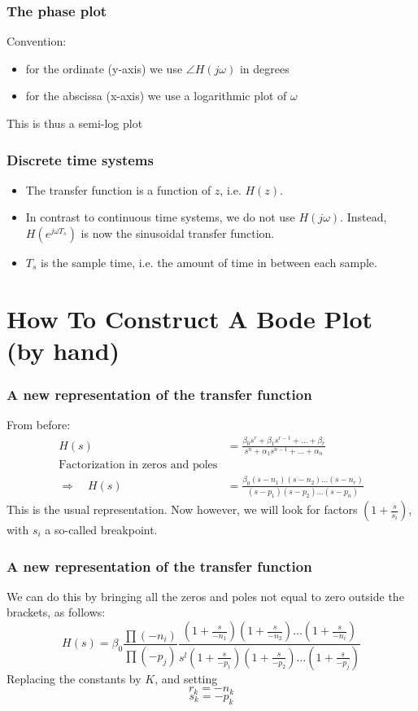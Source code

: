 \begin{frame}
\frametitle{The phase plot}
Convention:
\begin{itemize}
\item for the ordinate (y-axis) we use $\angle H(j\omega)$ in degrees
\item for the abscissa (x-axis) we use a logarithmic plot of $\omega$

\end{itemize}
This is thus a semi-log plot


\end{frame}



\begin{frame}
\frametitle{Discrete time systems}

\begin{itemize}
\item The transfer function is a function of $z$, i.e. $H(z)$.
\item In contrast to continuous time systems, we do not use $H(j\omega)$. Instead, $H(e^{j\omega T_s})$ is now the sinusoidal transfer function.
\item $T_s$ is the sample time, i.e. the amount of time in between each sample.
\end{itemize}


\end{frame}

\section{How To Construct A Bode Plot (by hand)}

\begin{frame}
\frametitle{A new representation of the transfer function}
From before:
\begin{align*}
H(s) &= \frac{\beta_0 s^r + \beta_1 s^{r-1} + \ldots + \beta_r}{s^n + \alpha_1 s^{n-1} + \ldots + \alpha_n}\\
\text{Factorization in zeros and poles}\\
\Rightarrow \quad
H(s) &= \frac{\beta_0 (s-n_1) (s-n_2) \ldots (s-n_r)}{(s-p_1) (s-p_2) \ldots (s-p_n)}
\end{align*}
This is the usual representation. Now however, we will look for factors $(1+\displaystyle{\frac{s}{s_i}})$, with $s_i$ a so-called breakpoint.


\end{frame}


\begin{frame}
\frametitle{A new representation of the transfer function}
We can do this by bringing all the zeros and poles not equal to zero outside the brackets, as follows:
$$H(s) = \beta_0 \frac{\prod(-n_i)}{\prod(-p_j)} \frac{(1+\frac{s}{-n_1}) (1+\frac{s}{-n_2}) \ldots (1+\frac{s}{-n_i})}{s^l (1+\frac{s}{-p_1}) (1+\frac{s}{-p_2}) \ldots (1 + \frac{s}{-p_j})}$$
 Replacing the constants by $K$, and setting $$r_k = -n_k$$ $$ s_k = -p_k$$ 



\end{frame}



